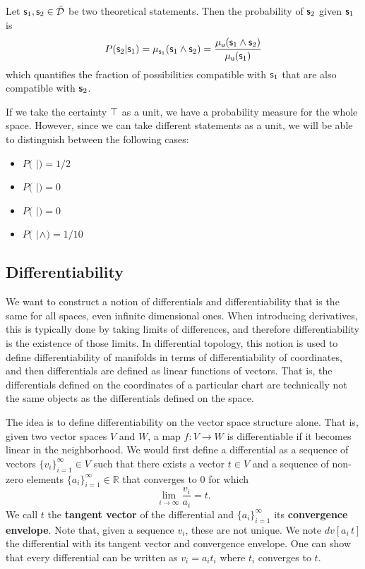 \documentclass[11pt,letterpaper,fleqn]{memoir} %
\begin{document}
Let $\stmt_1, \stmt_2 \in \tdomain$ be two theoretical statements. Then the probability of $\stmt_2$ given $\stmt_1$ is
\begin{equation}
	P(\stmt_2 | \stmt_1) = \mu_{\stmt_1}(\stmt_1 \AND \stmt_2) = \frac{\mu_{\stmt[u]}(\stmt_1 \AND \stmt_2)}{\mu_{\stmt[u]}(\stmt_1)}
\end{equation}
which quantifies the fraction of possibilities compatible with $\stmt_1$ that are also compatible with $\stmt_2$.

If we take the certainty $\certainty$ as a unit, we have a probability measure for the whole space. However, since we can take different statements as a unit, we will be able to distinguish between the following cases:
\begin{itemize}
	\item $P($ $|$$)=1/2$
	\item $P($ $|$$)=0$
	\item $P($ $|$$)=0$
	\item $P($ $|$$\AND$$)=1/10$
\end{itemize}

\subsection{Differentiability}

We want to construct a notion of differentials and differentiability that is the same for all spaces, even infinite dimensional ones. When introducing derivatives, this is typically done by taking limits of differences, and therefore differentiability is the existence of those limits. In differential topology, this notion is used to define differentiability of manifolds in terms of differentiability of coordinates, and then differentials are defined as linear functions of vectors. That is, the differentials defined on the coordinates of a particular chart are technically not the same objects as the differentials defined on the space.

The idea is to define differentiability on the vector space structure alone. That is, given two vector spaces $V$ and $W$, a map $f: V \to W$ is differentiable if it becomes linear in the neighborhood. We would first define a differential as a sequence of vectors $\{v_i\}_{i=1}^{\infty} \in V$ such that there exists a vector $t \in V$ and a sequence of non-zero elements $\{a_i\}_{i=1}^{\infty} \in \mathbb{R}$ that converges to $0$ for which
$$ \lim\limits_{i \to \infty} \frac{v_i}{a_i} = t.$$
We call $t$ the \textbf{tangent vector} of the differential and $\{a_i\}_{i=1}^{\infty}$ its \textbf{convergence envelope}. Note that, given a sequence $v_i$, these are not unique. We note $dv[a_i \, t]$ the differential with its tangent vector and convergence envelope. One can show that every differential can be written as $v_i = a_i t_i$ where $t_i$ converges to $t$.
\end{document}
